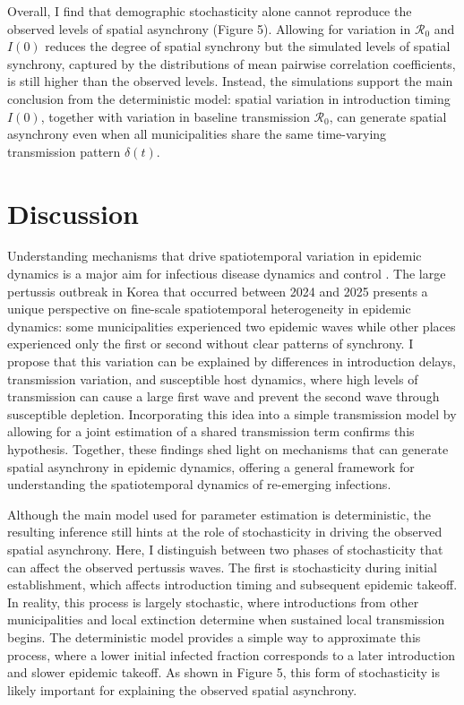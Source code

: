 \documentclass[12pt]{article}
\begin{document}
Overall, I find that demographic stochasticity alone cannot reproduce the observed levels of spatial asynchrony (Figure 5).
Allowing for variation in $\mathcal R_0$ and $I(0)$ reduces the degree of spatial synchrony but the simulated levels of spatial synchrony, captured by the distributions of mean pairwise correlation coefficients, is still higher than the observed levels.
Instead, the simulations support the main conclusion from the deterministic model: spatial variation in introduction timing $I(0)$, together with variation in baseline transmission $\mathcal R_0$, can generate spatial asynchrony even when all municipalities share the same time-varying transmission pattern $\delta(t)$.

\section*{Discussion}

Understanding mechanisms that drive spatiotemporal variation in epidemic dynamics is a major aim for infectious disease dynamics and control 
\citep{pitzer2015environmental,dalziel2018urbanization,pons2018seasonality,baker2019epidemic,grenfell2001travelling,cummings2004travelling,viboud2006synchrony}.
The large pertussis outbreak in Korea that occurred between 2024 and 2025 presents a unique perspective on fine-scale spatiotemporal heterogeneity in epidemic dynamics: 
some municipalities experienced two epidemic waves while other places experienced only the first or second without clear patterns of synchrony.
I propose that this variation can be explained by differences in introduction delays, transmission variation, and susceptible host dynamics, where high levels of transmission can cause a large first wave and prevent the second wave through susceptible depletion.
Incorporating this idea into a simple transmission model by allowing for a joint estimation of a shared transmission term confirms this hypothesis.
Together, these findings shed light on mechanisms that can generate spatial asynchrony in epidemic dynamics, offering a general framework for understanding the spatiotemporal dynamics of re-emerging infections.

Although the main model used for parameter estimation is deterministic, the resulting inference still hints at the role of stochasticity in driving the observed spatial asynchrony. 
Here, I distinguish between two phases of stochasticity that can affect the observed pertussis waves. 
The first is stochasticity during initial establishment, which affects introduction timing and subsequent epidemic takeoff. \citep{grenfell2001travelling,hempel2020estimating,zhang2026reconstructing} 
In reality, this process is largely stochastic, where introductions from other municipalities and local extinction determine when sustained local transmission begins. 
The deterministic model provides a simple way to approximate this process, where a lower initial infected fraction corresponds to a later introduction and slower epidemic takeoff.
As shown in Figure 5, this form of stochasticity is likely important for explaining the observed spatial asynchrony.
\end{document}
